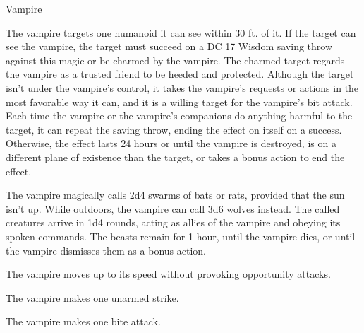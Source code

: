 \begin{monsterbox}{Vampire}
\begin{monsteraction}
\end{monsteraction}
\begin{monsteraction}[Charm]
The vampire targets one humanoid it can see within 30 ft. of it. If the target can see the vampire, the target must succeed on a DC 17 Wisdom saving throw against this magic or be charmed by the vampire. The charmed target regards the vampire as a trusted friend to be heeded and protected. Although the target isn't under the vampire's control, it takes the vampire's requests or actions in the most favorable way it can, and it is a willing target for the vampire's bit attack.
Each time the vampire or the vampire's companions do anything harmful to the target, it can repeat the saving throw, ending the effect on itself on a success. Otherwise, the effect lasts 24 hours or until the vampire is destroyed, is on a different plane of existence than the target, or takes a bonus action to end the effect.
\end{monsteraction}
\begin{monsteraction}
The vampire magically calls 2d4 swarms of bats or rats, provided that the sun isn't up. While outdoors, the vampire can call 3d6 wolves instead. The called creatures arrive in 1d4 rounds, acting as allies of the vampire and obeying its spoken commands. The beasts remain for 1 hour, until the vampire dies, or until the vampire dismisses them as a bonus action.
\end{monsteraction}
\begin{monsteraction}[Move]
The vampire moves up to its speed without provoking opportunity attacks.
\end{monsteraction}
\begin{monsteraction}
The vampire makes one unarmed strike.
\end{monsteraction}
\begin{monsteraction}
The vampire makes one bite attack.
\end{monsteraction}
\end{monsterbox}
